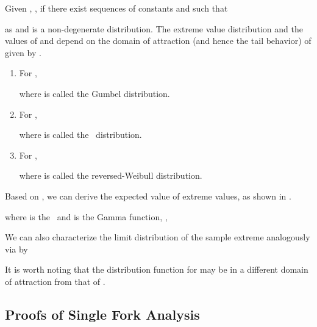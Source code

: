 \begin{thm}
    \label{thm:ev_thm}
    Given , , if there exist sequences of constants
     and  such that
    
    as  and  is a non-degenerate distribution. 
The extreme value distribution  and the values of   and  depend on the domain of attraction (and
hence the tail behavior) of  given by .
\begin{enumerate}
    \item For ,
        
        where  is called the {Gumbel distribution}.
    \item For ,
        
        where   is called the {\Frechet\ distribution}.
    \item For ,
        
        where  is called the {reversed-Weibull distribution}.
\end{enumerate}
\end{thm}
Based on , we can derive the expected value of extreme values, as shown in
.
\begin{lem}
    \label{lem:E_evt_dists}
    
    where  is the \EulerConstant\ and 
     is the Gamma function, \ie,
    
\end{lem}

We can also characterize the limit distribution of the sample extreme 
analogously via  by 

It is worth noting that the distribution function for  may be in a different
domain of attraction from that of .



\subsection{Proofs of Single Fork Analysis}
\label{sec:proof_single_fork_general}




